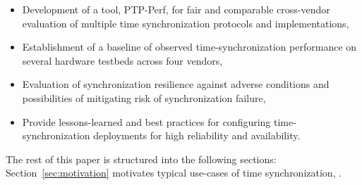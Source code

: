 \begin{itemize}
    \item Development of a tool, PTP-Perf, for fair and comparable cross-vendor evaluation of multiple time synchronization protocols and implementations,
    \item Establishment of a baseline of observed time-synchronization performance on several hardware testbeds across four vendors,
    \item Evaluation of synchronization resilience against adverse conditions and possibilities of mitigating risk of synchronization failure,
    \item Provide lessons-learned and best practices for configuring time-synchronization deployments for high reliability and availability.
\end{itemize}

The rest of this paper is structured into the following sections: Section~\ref{sec:motivation} motivates typical use-cases of time synchronization, .